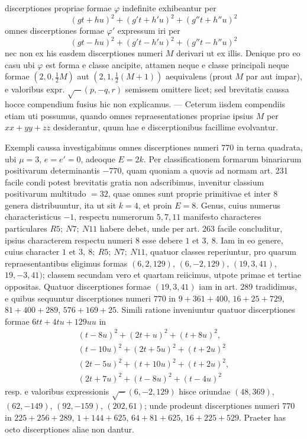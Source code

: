 discerptiones propriae formae \(\varphi\) indefinite exhibeantur per
\[
(gt+hu)^2+(g't+h'u)^2+(g''t+h''u)^2
\]
omnes discerptiones formae \(\varphi'\) expressum iri per
\[
(gt-hu)^2+(g't-h'u)^2+(g''t-h''u)^2
\]
nec non ex his easdem discerptiones numeri \(M\) derivari ut ex illis. Denique pro eo casu ubi \(\varphi\) est forma e classe ancipite, attamen neque e classe principali neque formae \((2,0,\frac12 M)\) aut \((2,1,\frac12(M+1))\) aequivalens (prout \(M\) par aut impar), e valoribus expr. \(\surd-(p,-q,r)\) semissem omittere licet; sed brevitatis caussa hocce compendium fusius hic non explicamus. --- Ceterum iisdem compendiis etiam uti possumus, quando omnes repraesentationes propriae ipsius \(M\) per \(xx+yy+zz\) desiderantur, quum hae e discerptionibus facillime evolvantur.

Exempli caussa investigabimus omnes discerptiones numeri \(770\) in terna quadrata, ubi \(\mu=3\), \(e=e'=0\), adeoque \(E=2k\). Per classificationem formarum binariarum positivarum determinantis \(-770\), quam quoniam a quovis ad normam art. 231 facile condi potest brevitatis gratia non adscribimus, invenitur classium positivarum multitudo \(=32\), quae omnes sunt proprie primitivae et inter \(8\) genera distribuuntur, ita ut sit \(k=4\), et proin \(E=8\). Genus, cuius numerus characteristicus \(-1\), respectu numerorum \(5,7,11\) manifesto characteres particulares \(R5;\ N7;\ N11\) habere debet, unde per art. 263 facile concluditur, ipsius characterem respectu numeri \(8\) esse debere \(1\text{ et }3,\ 8\). Iam in eo genere, cuius character \(1\text{ et }3,\ 8;\ R5;\ N7;\ N11\), quatuor classes reperiuntur, pro quarum repraesentantibus eligimus formas \((6,2,129)\), \((6,-2,129)\), \((19,3,41)\), \(19,-3,41)\); classem secundam vero et quartam reiicimus, utpote primae et tertiae oppositas. Quatuor discerptiones formae \((19,3,41)\) iam in art. 289 tradidimus, e quibus sequuntur discerptiones numeri \(770\) in \(9+361+400\), \(16+25+729\), \(81+400+289\), \(576+169+25\). Simili ratione inveniuntur quatuor discerptiones formae \(6tt+4tu+129uu\) in
\[
\begin{gathered}
(t-8u)^2+(2t+u)^2+(t+8u)^2,\\
(t-10u)^2+(2t+5u)^2+(t+2u)^2\\
(2t-5u)^2+(t+10u)^2+(t+2u)^2,\\
(2t+7u)^2+(t-8u)^2+(t-4u)^2
\end{gathered}
\]
resp. e valoribus expressionis \(\surd-(6,-2,129)\) hisce oriundae \((48,369)\), \((62,-149)\), \((92,-159)\), \((202,61)\); unde prodeunt discerptiones numeri \(770\) in \(225+256+289\), \(1+144+625\), \(64+81+625\), \(16+225+529\). Praeter has octo discerptiones aliae non dantur.

